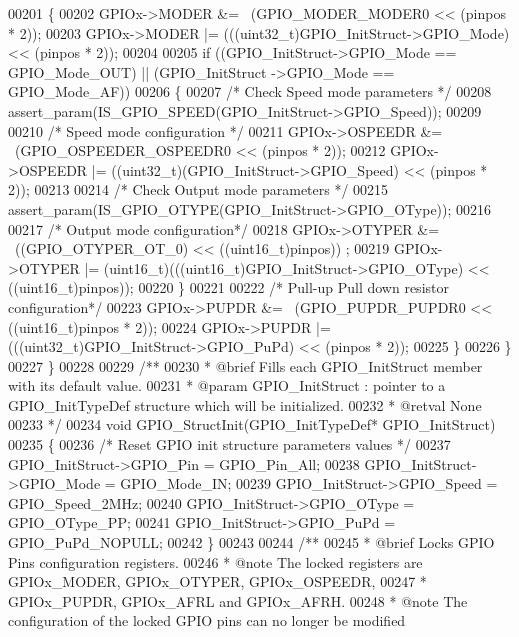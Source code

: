 \begin{DoxyCode}
00201     \{
00202       GPIOx->MODER  &= ~(GPIO_MODER_MODER0 << (pinpos * 2));
00203       GPIOx->MODER |= (((uint32\_t)GPIO\_InitStruct->GPIO\_Mode) << (pinpos * 2));
00204 
00205       \textcolor{keywordflow}{if} ((GPIO\_InitStruct->GPIO_Mode == GPIO_Mode_OUT) || (GPIO\_InitStruct
      ->GPIO_Mode == GPIO_Mode_AF))
00206       \{
00207         \textcolor{comment}{/* Check Speed mode parameters */}
00208         assert_param(IS\_GPIO\_SPEED(GPIO\_InitStruct->GPIO\_Speed));
00209 
00210         \textcolor{comment}{/* Speed mode configuration */}
00211         GPIOx->OSPEEDR &= ~(GPIO_OSPEEDER_OSPEEDR0 << (pinpos * 2));
00212         GPIOx->OSPEEDR |= ((uint32\_t)(GPIO\_InitStruct->GPIO\_Speed) << (pinpos * 2));
00213 
00214         \textcolor{comment}{/* Check Output mode parameters */}
00215         assert_param(IS\_GPIO\_OTYPE(GPIO\_InitStruct->GPIO\_OType));
00216 
00217         \textcolor{comment}{/* Output mode configuration*/}
00218         GPIOx->OTYPER  &= ~((GPIO_OTYPER_OT_0) << ((uint16\_t)pinpos)) ;
00219         GPIOx->OTYPER |= (uint16\_t)(((uint16\_t)GPIO\_InitStruct->GPIO\_OType) << ((uint16\_t)pinpos));
00220       \}
00221 
00222       \textcolor{comment}{/* Pull-up Pull down resistor configuration*/}
00223       GPIOx->PUPDR &= ~(GPIO_PUPDR_PUPDR0 << ((uint16\_t)pinpos * 2));
00224       GPIOx->PUPDR |= (((uint32\_t)GPIO\_InitStruct->GPIO\_PuPd) << (pinpos * 2));
00225     \}
00226   \}
00227 \}
00228 
00229 \textcolor{comment}{/**}
00230 \textcolor{comment}{  * @brief  Fills each GPIO\_InitStruct member with its default value.}
00231 \textcolor{comment}{  * @param  GPIO\_InitStruct : pointer to a GPIO\_InitTypeDef structure which will be initialized.}
00232 \textcolor{comment}{  * @retval None}
00233 \textcolor{comment}{  */}
00234 \textcolor{keywordtype}{void} GPIO_StructInit(GPIO\_InitTypeDef* GPIO\_InitStruct)
00235 \{
00236   \textcolor{comment}{/* Reset GPIO init structure parameters values */}
00237   GPIO\_InitStruct->GPIO_Pin  = GPIO_Pin_All;
00238   GPIO\_InitStruct->GPIO_Mode = GPIO_Mode_IN;
00239   GPIO\_InitStruct->GPIO_Speed = GPIO_Speed_2MHz;
00240   GPIO\_InitStruct->GPIO_OType = GPIO_OType_PP;
00241   GPIO\_InitStruct->GPIO_PuPd = GPIO_PuPd_NOPULL;
00242 \}
00243 
00244 \textcolor{comment}{/**}
00245 \textcolor{comment}{  * @brief  Locks GPIO Pins configuration registers.}
00246 \textcolor{comment}{  * @note   The locked registers are GPIOx\_MODER, GPIOx\_OTYPER, GPIOx\_OSPEEDR,}
00247 \textcolor{comment}{  *         GPIOx\_PUPDR, GPIOx\_AFRL and GPIOx\_AFRH.}
00248 \textcolor{comment}{  * @note   The configuration of the locked GPIO pins can no longer be modified}

\end{DoxyCode}
